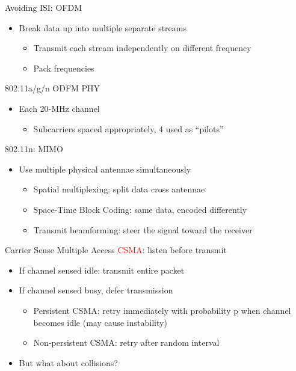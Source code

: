 \documentclass[pdf]{beamer}
\begin{document}

\begin{frame}{Avoiding ISI: OFDM }   
  \begin{itemize}
  \item  Break data up into multiple separate streams
    \begin{itemize}
    \item  Transmit each stream independently on different frequency
    \item Pack frequencies
    \end{itemize}
  \end{itemize}
\end{frame}

\begin{frame}{ 802.11a/g/n ODFM PHY}
  \begin{itemize}
  \item Each 20-MHz channel
    \begin{itemize}
    \item Subcarriers spaced appropriately, 4 used as ``pilots''
    \end{itemize}
  \end{itemize}
\end{frame}


\begin{frame}{802.11n: MIMO}
  \begin{itemize}
  \item   Use multiple physical antennae simultaneously
    \begin{itemize}
    \item Spatial multiplexing: split data cross antennae
    \item Space-Time Block Coding: same data, encoded differently
    \item Transmit beamforming: steer the signal toward the receiver 
    \end{itemize}
  \end{itemize}
\end{frame}


\begin{frame}{Carrier Sense Multiple Access}
\textcolor{red}{CSMA}: listen before transmit
  \begin{itemize}
  \item If channel sensed idle: transmit entire packet
  \item If channel sensed busy, defer transmission
    \begin{itemize}
    \item Persistent CSMA: retry immediately with probability p when channel becomes idle (may cause instability)
    \item Non-persistent CSMA: retry after random interval
    \end{itemize}
  \item But what about collisions?
  \end{itemize}
\end{frame}
\end{document}
